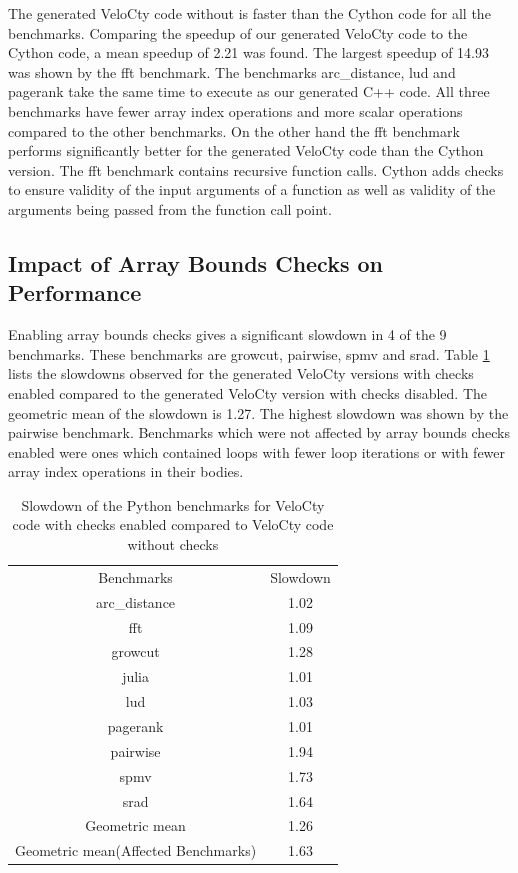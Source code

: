 The generated VeloCty code without is faster than the Cython code for all the benchmarks. Comparing the speedup of our generated VeloCty code to the Cython code, a mean speedup of 2.21 was found. The largest speedup of 14.93 was shown by the fft benchmark. The benchmarks \textsf{arc\_distance}, \textsf{lud} and \textsf{pagerank} take the same time to execute as our generated C++ code. All three benchmarks have fewer array index operations and more scalar operations compared to the other benchmarks. On the other hand the fft benchmark performs significantly better for the generated VeloCty code than the Cython version. The fft benchmark contains recursive function calls. Cython adds checks to ensure validity of the input arguments of a function as well as validity of the arguments being passed from the function call point. 

\subsection{Impact of Array Bounds Checks on Performance}
Enabling array bounds checks gives a significant slowdown in 4 of the 9 benchmarks. These benchmarks are growcut, pairwise, spmv and srad. Table \ref{tab:cwvscwopy} lists the slowdowns observed for the generated VeloCty versions with checks enabled compared to the generated VeloCty version with checks disabled. The geometric mean of the slowdown is 1.27. The highest slowdown was shown by the pairwise benchmark. Benchmarks which were not affected by array bounds checks enabled were ones which contained loops with fewer loop iterations or with fewer array index operations in their bodies. 
\begin{table}[htbp]
\centering
\begin{tabular}{|c|c|}
\hline
Benchmarks     & Slowdown    \\ \hhline{|=|=|}
arc\_distance  & 1.02\\ \hline
fft            & 1.09\\ \hline
growcut        & 1.28\\ \hline
julia          & 1.01\\ \hline
lud            & 1.03\\ \hline
pagerank       & 1.01\\ \hline
pairwise       & 1.94\\ \hline
spmv           & 1.73\\ \hline
srad           & 1.64\\ \hline
Geometric mean & 1.26\\ \hline
Geometric mean(Affected Benchmarks)  &  1.63 \\ \hline
\end{tabular}
\caption{Slowdown of the Python benchmarks for VeloCty code with checks enabled compared to VeloCty code without checks}
\label{tab:cwvscwopy}
\end{table}
